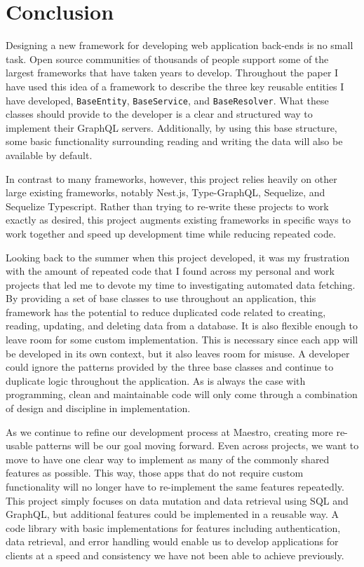 \section{Conclusion}

Designing a new framework for developing web application back-ends is no small task.  Open source communities of thousands of people support some of the largest frameworks that have taken years to develop. Throughout the paper I have used this idea of a framework to describe the three key reusable entities I have developed, \verb!BaseEntity!, \verb!BaseService!, and \verb!BaseResolver!.  What these classes should provide to the developer is a clear and structured way to implement their GraphQL servers.  Additionally, by using this base structure, some basic functionality surrounding reading and writing the data will also be available by default.

In contrast to many frameworks, however, this project relies heavily on other large existing frameworks, notably Nest.js, Type-GraphQL, Sequelize, and Sequelize Typescript.  Rather than trying to re-write these projects to work exactly as desired, this project augments existing frameworks in specific ways to work together and speed up development time while reducing repeated code.

Looking back to the summer when this project developed, it was my frustration with the amount of repeated code that I found across my personal and work projects that led me to devote my time to investigating automated data fetching.  By providing a set of base classes to use throughout an application, this framework has the potential to reduce duplicated code related to creating, reading, updating, and deleting data from a database.  It is also flexible enough to leave room for some custom implementation.  This is necessary since each app will be developed in its own context, but it also leaves room for misuse.  A developer could ignore the patterns provided by the three base classes and continue to duplicate logic throughout the application.  As is always the case with programming, clean and maintainable code will only come through a combination of design and discipline in implementation.

As we continue to refine our development process at Maestro, creating more re-usable patterns will be our goal moving forward.  Even across projects, we want to move to have one clear way to implement as many of the commonly shared features as possible.  This way, those apps that do not require custom functionality will no longer have to re-implement the same features repeatedly.  This project simply focuses on data mutation and data retrieval using SQL and GraphQL, but additional features could be implemented in a reusable way.  A code library with basic implementations for features including authentication, data retrieval, and error handling would enable us to develop applications for clients at a speed and consistency we have not been able to achieve previously.